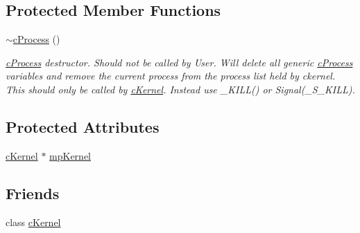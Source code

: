 \subsection*{Protected Member Functions}
\begin{DoxyCompactItemize}
\item 
\hyperlink{classc_process_a2193fbce3f18979c4b3323ca62f4863d}{$\sim$cProcess} ()
\begin{DoxyCompactList}\small\item\em \hyperlink{classc_process}{cProcess} destructor. Should not be called by User. Will delete all generic \hyperlink{classc_process}{cProcess} variables and remove the current process from the process list held by ckernel. This should only be called by \hyperlink{classc_kernel}{cKernel}. Instead use \_\-KILL() or Signal(\_\-S\_\-KILL). \item\end{DoxyCompactList}\end{DoxyCompactItemize}
\subsection*{Protected Attributes}
\begin{DoxyCompactItemize}
\item 
\hyperlink{classc_kernel}{cKernel} $\ast$ \hyperlink{classc_process_a66009bc1498c7ac90a00731914682d0f}{mpKernel}
\end{DoxyCompactItemize}
\subsection*{Friends}
\begin{DoxyCompactItemize}
\item 
class \hyperlink{classc_process_ad3a3477f115d2be6d39a69bdff272ca5}{cKernel}
\end{DoxyCompactItemize}


